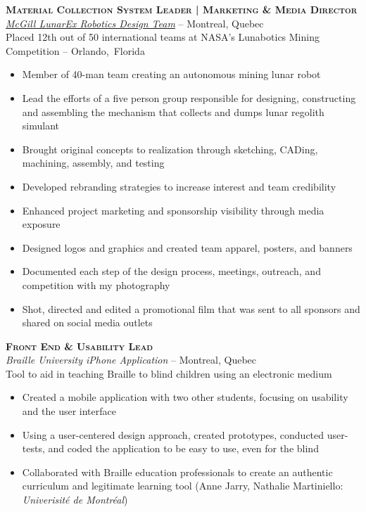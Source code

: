\documentclass[12pt, letterpaper]{article} %
\newcommand{\years}[1]{\marginnote{\scriptsize #1}} %
\begin{document}
\clearpage

\begin{samepage}
\years{8/2012 - 8/2013} \textbf{\scshape Material Collection System Leader | Marketing \& Media Director}\\
\href{http://www.lunarex.mcgill.ca}{\textit{McGill LunarEx Robotics Design Team}} -- Montreal, Quebec\\
\small Placed 12th out of 50 international teams at NASA's Lunabotics Mining Competition -- Orlando,~Florida
\begin{itemize}
\item Member of 40-man team creating an autonomous mining lunar robot 
\item Lead the efforts of a five person group responsible for designing, constructing and assembling the mechanism that collects and dumps lunar regolith simulant
\item Brought original concepts to realization through sketching, CADing, machining, assembly, and testing
\item Developed rebranding strategies to increase interest and team credibility
\item Enhanced project marketing and sponsorship visibility through media exposure
\item Designed logos and graphics and created team apparel, posters, and banners
\item Documented each step of the design process,  meetings, outreach, and competition with my photography
\item Shot, directed and edited a promotional film that was sent to all sponsors and shared on social media outlets
\end{itemize}
\end {samepage}

\begin{samepage}
\years{1/2013 - 8/2013} \textbf{\scshape Front End \& Usability Lead}\\
\textit{Braille University iPhone Application} -- Montreal, Quebec\\
\small Tool to aid in teaching Braille to blind children using an electronic medium 
\begin{itemize}
\item Created a mobile application with two other students, focusing on usability and the user interface
\item Using a user-centered design approach, created prototypes, conducted user-tests, and coded the application to be easy to use, even for the blind
\item Collaborated with Braille education professionals to create an authentic curriculum and legitimate learning tool (Anne Jarry, Nathalie Martiniello: \textit {Univerisit\'e de Montr\'eal})
\end{itemize}
\end {samepage}
\end{document}
